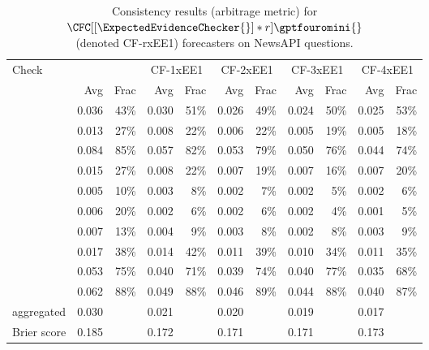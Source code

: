 {\begin{table}[htbp]
\caption{Consistency results (arbitrage metric) for $\CFC[[\ExpectedEvidenceChecker{}]*r]{\gptfouromini{}}$ \\(denoted CF-rxEE1) forecasters on NewsAPI questions.}
\begin{tabular}{lrrrrrrrrrr}
\toprule
Check & \multicolumn{2}{c}{\gptfouromini{}} & \multicolumn{2}{c}{CF-1xEE1} & \multicolumn{2}{c}{CF-2xEE1} & \multicolumn{2}{c}{CF-3xEE1} & \multicolumn{2}{c}{CF-4xEE1} \\
 & Avg & Frac & Avg & Frac & Avg & Frac & Avg & Frac & Avg & Frac \\
\midrule
\NegChecker{} & 0.036 & 43\% & 0.030 & 51\% & 0.026 & 49\% & 0.024 & 50\% & 0.025 & 53\% \\
\ParaphraseChecker{} & 0.013 & 27\% & 0.008 & 22\% & 0.006 & 22\% & 0.005 & 19\% & 0.005 & 18\% \\
\CondCondChecker{} & 0.084 & 85\% & 0.057 & 82\% & 0.053 & 79\% & 0.050 & 76\% & 0.044 & 74\% \\
\ExpectedEvidenceChecker{} & 0.015 & 27\% & 0.008 & 22\% & 0.007 & 19\% & 0.007 & 16\% & 0.007 & 20\% \\
\ConsequenceChecker{} & 0.005 & 10\% & 0.003 & 8\% & 0.002 & 7\% & 0.002 & 5\% & 0.002 & 6\% \\
\AndChecker{} & 0.006 & 20\% & 0.002 & 6\% & 0.002 & 6\% & 0.002 & 4\% & 0.001 & 5\% \\
\OrChecker{} & 0.007 & 13\% & 0.004 & 9\% & 0.003 & 8\% & 0.002 & 8\% & 0.003 & 9\% \\
\AndOrChecker{} & 0.017 & 38\% & 0.014 & 42\% & 0.011 & 39\% & 0.010 & 34\% & 0.011 & 35\% \\
\ButChecker{} & 0.053 & 75\% & 0.040 & 71\% & 0.039 & 74\% & 0.040 & 77\% & 0.035 & 68\% \\
\CondChecker{} & 0.062 & 88\% & 0.049 & 88\% & 0.046 & 89\% & 0.044 & 88\% & 0.040 & 87\% \\
aggregated & 0.030 &  & 0.021 &  & 0.020 &  & 0.019 &  & 0.017 &  \\
Brier score & 0.185 &  & 0.172 &  & 0.171 &  & 0.171 &  & 0.173 &  \\
\bottomrule
\end{tabular}
\label{tab:cf-ee}
\end{table}
}

